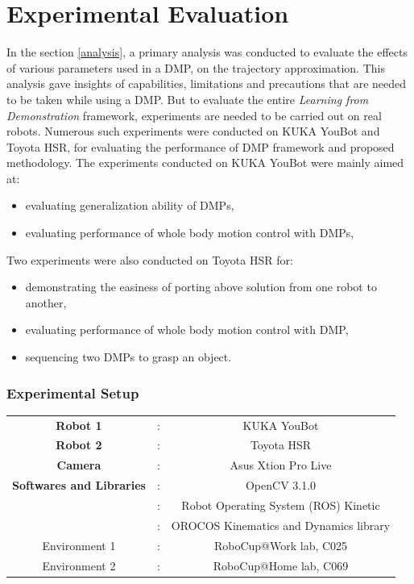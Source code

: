 
\chapter{Experimental Evaluation}
In the section \ref{analysis}, a primary analysis was conducted to evaluate the effects of various parameters used in a DMP, on the trajectory approximation. This analysis gave insights of capabilities, limitations and precautions that are needed to be taken while using a DMP. But to evaluate the entire \textit{Learning from Demonstration} framework, experiments are needed to be carried out on real robots. Numerous such experiments were conducted on KUKA YouBot and Toyota HSR, for evaluating the performance of DMP framework and proposed methodology. The experiments conducted on KUKA YouBot were mainly aimed at:
\begin{itemize}
	\item evaluating generalization ability of DMPs,
	\item evaluating performance of whole body motion control with DMPs,  
\end{itemize}
Two experiments were also conducted on Toyota HSR for:
\begin{itemize}
	\item demonstrating the easiness of porting above solution from one robot to another,
	\item evaluating performance of whole body motion control with DMP,
	\item sequencing two DMPs to grasp an object.
\end{itemize} 

\subsection{Experimental Setup}

\begin{tabular}{c c c}
	\textbf{Robot 1} & : & KUKA YouBot \\       
	\textbf{Robot 2} & : & Toyota HSR \\
	\textbf{Camera} & : & Asus Xtion Pro Live\\
	\textbf{Softwares and Libraries} & : & OpenCV 3.1.0 \\
	 & : & Robot Operating System (ROS) Kinetic \\
	 & : & OROCOS Kinematics and Dynamics library \\
	 Environment 1 & : & RoboCup@Work lab, C025 \\
	 Environment 2 & : & RoboCup@Home lab, C069
	 
	                                      
\end{tabular}
 

